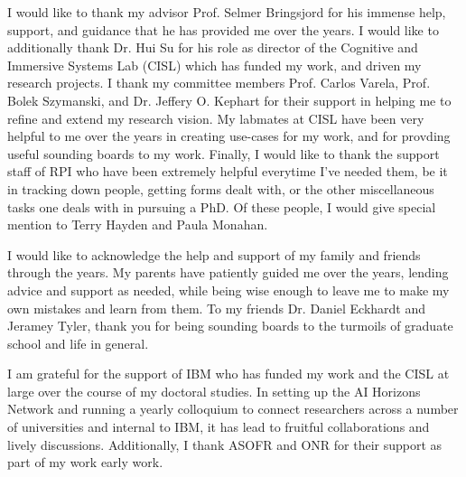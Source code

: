 
 
I would like to thank my advisor Prof. Selmer Bringsjord for his immense help, support, and guidance
that he has provided me over the years. I would like to additionally thank Dr. Hui Su for his
role as director of the Cognitive and Immersive Systems Lab (CISL) which has funded my work, and driven
my research projects. I thank my committee members Prof. Carlos Varela, Prof. Bolek Szymanski, and
Dr. Jeffery O. Kephart for their support in helping me to refine and extend my research vision. My
labmates at CISL have been very helpful to me over the years in creating use-cases for my work,
and for provding useful sounding boards to my work. Finally, I would like to thank the support
staff of RPI who have been extremely helpful everytime I've needed them, be it in tracking down
people, getting forms dealt with, or the other miscellaneous tasks one deals with in pursuing a
PhD. Of these people, I would give special mention to Terry Hayden and Paula Monahan.

I would like to acknowledge the help and support of my family and friends through the years.
My parents have patiently guided me over the years, lending advice and support as needed, while
being wise enough to leave me to make my own mistakes and learn from them. To my friends Dr. Daniel
Eckhardt and Jeramey Tyler, thank you for being sounding boards to the turmoils of graduate school
and life in general.

I am grateful for the support of IBM who has funded my work and the CISL at large over the
course of my doctoral studies. In setting up the AI Horizons Network and running a yearly
colloquium to connect researchers across a number of universities and internal to IBM, it has
lead to fruitful collaborations and lively discussions. Additionally, I thank ASOFR and ONR
for their support as part of my work early work.